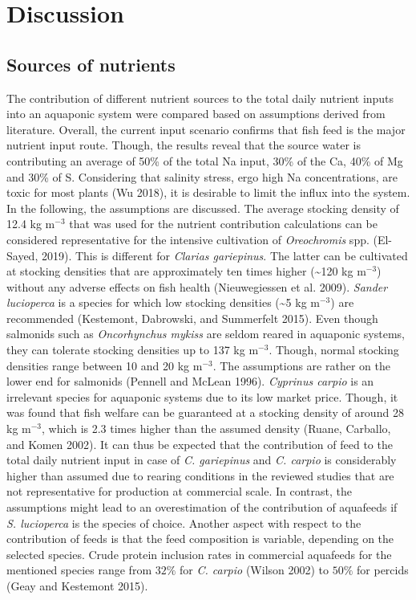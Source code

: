 \documentclass[
]{article}
\begin{document}
\hypertarget{discussion}{%
\section{Discussion}\label{discussion}}

\hypertarget{sources-of-nutrients}{%
\subsection{Sources of nutrients}\label{sources-of-nutrients}}

The contribution of different nutrient sources to the total daily nutrient inputs into an aquaponic system were compared based on assumptions derived from literature.
Overall, the current input scenario confirms that fish feed is the major nutrient input route. Though, the results reveal that the source water is contributing an average of 50\% of the total Na input, 30\% of the Ca, 40\% of Mg and 30\% of S. Considering that salinity stress, ergo high Na concentrations, are toxic for most plants (Wu 2018), it is desirable to limit the influx into the system.
In the following, the assumptions are discussed. The average stocking density of 12.4 kg m\(^{-3}\) that was used for the nutrient contribution calculations can be considered representative for the intensive cultivation of \emph{Oreochromis} spp. (El-Sayed, 2019).
This is different for \emph{Clarias gariepinus}. The latter can be cultivated at stocking densities that are approximately ten times higher (\textasciitilde120 kg m\(^{-3}\)) without any adverse effects on fish health (Nieuwegiessen et al. 2009).
\emph{Sander lucioperca} is a species for which low stocking densities (\textasciitilde5 kg m\(^{-3}\)) are recommended (Kestemont, Dabrowski, and Summerfelt 2015).
Even though salmonids such as \emph{Oncorhynchus mykiss} are seldom reared in aquaponic systems, they can tolerate stocking densities up to 137 kg m\(^{-3}\). Though, normal stocking densities range between 10 and 20 kg m\(^{-3}\). The assumptions are rather on the lower end for salmonids (Pennell and McLean 1996).
\emph{Cyprinus carpio} is an irrelevant species for aquaponic systems due to its low market price. Though, it was found that fish welfare can be guaranteed at a stocking density of around 28 kg m\(^{-3}\), which is 2.3 times higher than the assumed density (Ruane, Carballo, and Komen 2002).
It can thus be expected that the contribution of feed to the total daily nutrient input in case of \emph{C. gariepinus} and \emph{C. carpio} is considerably higher than assumed due to rearing conditions in the reviewed studies that are not representative for production at commercial scale. In contrast, the assumptions might lead to an overestimation of the contribution of aquafeeds if \emph{S. lucioperca} is the species of choice.
Another aspect with respect to the contribution of feeds is that the feed composition is variable, depending on the selected species. Crude protein inclusion rates in commercial aquafeeds for the mentioned species range from \(32\%\) for \emph{C. carpio} (Wilson 2002) to \(50\%\) for percids (Geay and Kestemont 2015).
\end{document}
